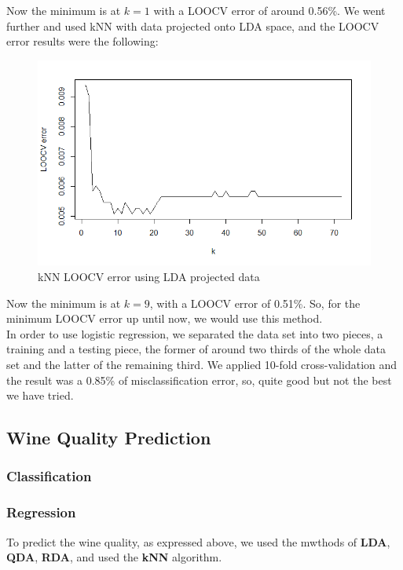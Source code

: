 \documentclass[10pt]{article}
\begin{document}
Now the minimum is at $k=1$ with a LOOCV error of around 0.56\%. We went further and used kNN with data projected onto LDA space, and the LOOCV error results were the following:
\begin{figure}[H]
\centering
\caption{kNN LOOCV error using LDA projected data}
\includegraphics[scale=0.5]{kNN_LDA_LOOCV_error}
\end{figure}
Now the minimum is at $k=9$, with a LOOCV error of 0.51\%. So, for the minimum LOOCV error up until now, we would use this method.\\

In order to use logistic regression, we separated the data set into two pieces, a training and a testing piece, the former of around two thirds of the whole data set and the latter of the remaining third. We applied 10-fold cross-validation and the result was a 0.85\% of misclassification error, so, quite good but not the best we have tried.
\subsection{Wine Quality Prediction}

\subsubsection{Classification}
\subsubsection{Regression}

To predict the wine quality, as expressed above, we used the mwthods of \textbf{LDA}, \textbf{QDA}, \textbf{RDA}, and used the \textbf{kNN} algorithm.\\
\end{document}

